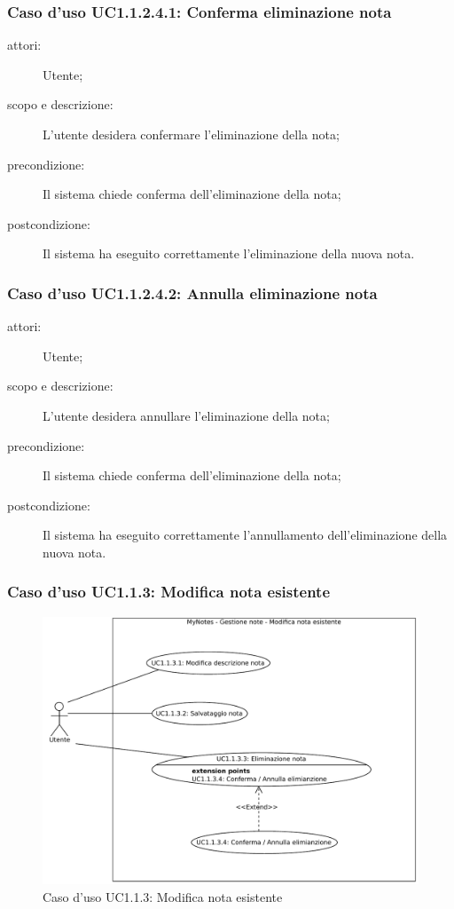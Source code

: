 \subsubsection{Caso d'uso UC1.1.2.4.1: Conferma eliminazione nota}
\begin{description}
\item[attori:] Utente;
\item[scopo e descrizione:] L'utente desidera confermare l'eliminazione della nota;
\item[precondizione:] Il sistema chiede conferma dell'eliminazione della nota;
\item[postcondizione:] Il sistema ha eseguito correttamente l'eliminazione della nuova nota.
\end{description}

\subsubsection{Caso d'uso UC1.1.2.4.2: Annulla eliminazione nota}
\begin{description}
\item[attori:] Utente;
\item[scopo e descrizione:] L'utente desidera annullare l'eliminazione della nota;
\item[precondizione:] Il sistema chiede conferma dell'eliminazione della nota;
\item[postcondizione:] Il sistema ha eseguito correttamente l'annullamento dell'eliminazione della nuova nota.
\end{description}

\subsubsection{Caso d'uso UC1.1.3: Modifica nota esistente}
\begin{figure}[htb]
\centering
\includegraphics[scale=0.5]{gfx/useCase/MN_UC1-1-3_Modifica_nota_esistente.pdf}
\caption{Caso d'uso UC1.1.3: Modifica nota esistente}
\label{fig:My notes UC1.1.3}
\end{figure}


